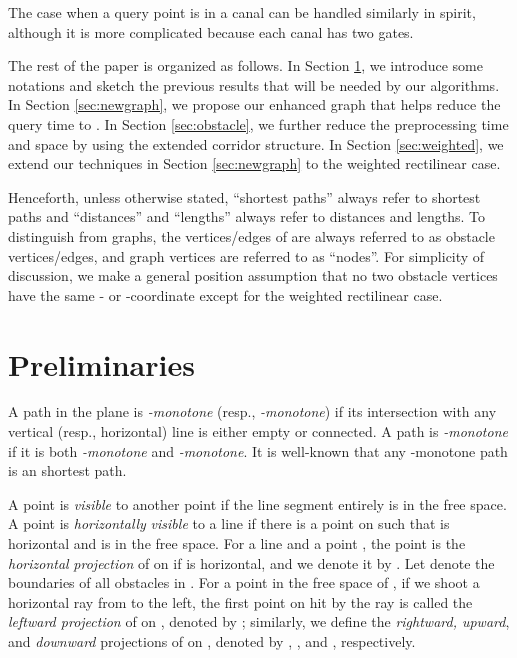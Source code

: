 \documentclass[english,runningheads,11pt]{llncs}
\begin{document}
The case when a query point is in a canal can be handled similarly in spirit,
although it is more complicated because each canal has two gates.



The rest of the paper is organized as follows. In Section
\ref{sec:pre}, we introduce some notations and sketch the previous results
that will be needed by our algorithms. In Section
\ref{sec:newgraph}, we
propose our enhanced graph  that helps reduce the query time to . In
Section \ref{sec:obstacle}, we further reduce
the preprocessing time and space by using the extended corridor
structure. In Section \ref{sec:weighted}, we
extend our techniques in Section \ref{sec:newgraph} to the weighted
rectilinear case.


Henceforth, unless otherwise stated, ``shortest paths'' always refer
to  shortest paths and ``distances'' and ``lengths'' always refer to 
distances and lengths. To distinguish from graphs, the vertices/edges of
 are always referred to as obstacle vertices/edges,
and graph vertices are referred to as ``nodes''. For
simplicity of discussion, we make a general position assumption that
no two obstacle vertices have the same - or
-coordinate except for the weighted rectilinear case.


\section{Preliminaries}
\label{sec:pre}

A path in the plane is {\em -monotone} (resp., {\em -monotone})
if its intersection with any
vertical (resp., horizontal) line is either empty or connected. A
path is {\em -monotone} if it is both {\em -monotone} and {\em
-monotone}. It is well-known that any -monotone path is an
 shortest path.

A point  is {\em visible} to another point  if the line segment
 entirely is in the free space.
A point  is {\it horizontally} {\it visible} to a line  if
there is a point  on  such that 
is horizontal and is in the free space.
For a line  and a point , the point  is the {\em horizontal}
{\it projection} of  on  if  is horizontal, and we denote it by .
Let  denote the boundaries
of all obstacles in . For a point  in the free space of
, if we shoot a horizontal ray from  to the left, the first point on
 hit by the ray is called the {\em leftward projection} of  on
, denoted by ; similarly, we define the
{\em rightward, upward}, and {\em downward} projections of  on
, denoted by , , and , respectively.
\end{document}
